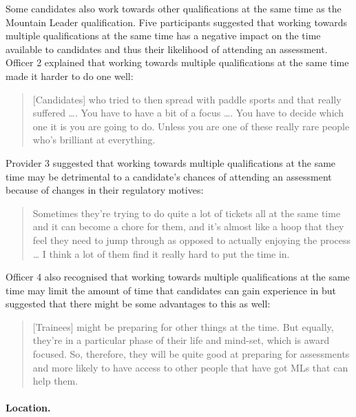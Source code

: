 \documentclass[
  12pt,
  a4paper,
]{book}
\begin{document}
Some candidates also work towards other qualifications at the same time as the Mountain Leader qualification. Five participants suggested that working towards multiple qualifications at the same time has a negative impact on the time available to candidates and thus their likelihood of attending an assessment. Officer 2 explained that working towards multiple qualifications at the same time made it harder to do one well:

\begin{quote}
{[}Candidates{]} who tried to then spread with paddle sports and that really suffered \ldots. You have to have a bit of a focus \ldots. You have to decide which one it is you are going to do. Unless you are one of these really rare people who's brilliant at everything.
\end{quote}

Provider 3 suggested that working towards multiple qualifications at the same time may be detrimental to a candidate's chances of attending an assessment because of changes in their regulatory motives:

\begin{quote}
Sometimes they're trying to do quite a lot of tickets all at the same time and it can become a chore for them, and it's almost like a hoop that they feel they need to jump through as opposed to actually enjoying the process \ldots{} I think a lot of them find it really hard to put the time in.
\end{quote}

Officer 4 also recognised that working towards multiple qualifications at the same time may limit the amount of time that candidates can gain experience in but suggested that there might be some advantages to this as well:

\begin{quote}
{[}Trainees{]} might be preparing for other things at the time. But equally, they're in a particular phase of their life and mind-set, which is award focused. So, therefore, they will be quite good at preparing for assessments and more likely to have access to other people that have got MLs that can help them.
\end{quote}

\hypertarget{qual-gta-location}{%
\paragraph{Location.}\label{qual-gta-location}}
\end{document}
